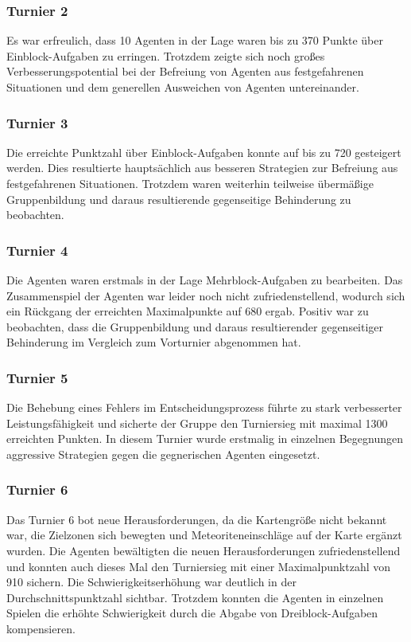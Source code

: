 \documentclass[runningheads]{llncs}
\begin{document}
	\subsubsection{Turnier 2}
	Es war erfreulich, dass 10 Agenten in der Lage waren bis zu 370 Punkte über Einblock-Aufgaben zu erringen. Trotzdem zeigte sich noch großes Verbesserungspotential bei der Befreiung von Agenten aus festgefahrenen Situationen und dem generellen Ausweichen von Agenten untereinander.
	
	\subsubsection{Turnier 3}
	Die erreichte Punktzahl über Einblock-Aufgaben konnte auf bis zu 720 gesteigert werden. Dies resultierte hauptsächlich aus besseren Strategien zur Befreiung aus festgefahrenen Situationen. Trotzdem waren weiterhin teilweise übermäßige Gruppenbildung und daraus resultierende gegenseitige Behinderung zu beobachten.
	
	\subsubsection{Turnier 4}
	Die Agenten waren erstmals in der Lage Mehrblock-Aufgaben zu bearbeiten. Das Zusammenspiel der Agenten war leider noch nicht zufriedenstellend, wodurch sich ein Rückgang der erreichten Maximalpunkte auf 680 ergab. Positiv war zu beobachten, dass die Gruppenbildung und daraus resultierender gegenseitiger Behinderung im Vergleich zum Vorturnier abgenommen hat.
	
	\subsubsection{Turnier 5}
	Die Behebung eines Fehlers im Entscheidungsprozess führte zu stark verbesserter Leistungsfähigkeit und sicherte der Gruppe den Turniersieg mit maximal 1300 erreichten Punkten. In diesem Turnier wurde erstmalig in einzelnen Begegnungen aggressive Strategien gegen die gegnerischen Agenten eingesetzt.
	
	\subsubsection{Turnier 6}
	Das Turnier 6 bot neue Herausforderungen, da die Kartengröße nicht bekannt war, die Zielzonen sich bewegten und Meteoriteneinschläge auf der Karte ergänzt wurden. Die Agenten bewältigten die neuen Herausforderungen zufriedenstellend und konnten auch dieses Mal den Turniersieg mit einer Maximalpunktzahl von 910 sichern. Die Schwierigkeitserhöhung war deutlich in der Durchschnittspunktzahl sichtbar. Trotzdem konnten die Agenten in einzelnen Spielen die erhöhte Schwierigkeit durch die Abgabe von Dreiblock-Aufgaben kompensieren.
	
\end{document}
